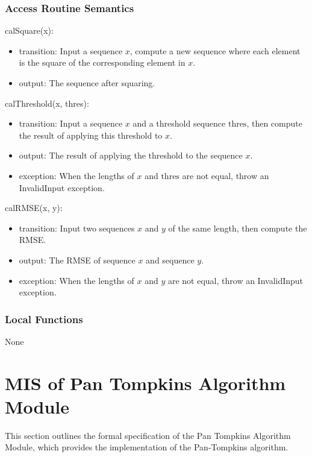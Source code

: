 \documentclass[12pt, titlepage]{article}
\begin{document}
\subsubsection{Access Routine Semantics}

\noindent calSquare(x):
\begin{itemize}
\item transition: Input a sequence $x$, compute a new sequence where each
element is the square of the corresponding element in $x$.
\item output: The sequence after squaring.
\end{itemize}

\noindent calThreshold(x, thres):
\begin{itemize}
\item transition: Input a sequence $x$ and a threshold sequence $\text{thres}$,
then compute the result of applying this threshold to $x$.
\item output: The result of applying the threshold to the sequence $x$.
\item exception: When the lengths of $x$ and $\text{thres}$ are not equal, throw
an InvalidInput exception.
\end{itemize}

\noindent calRMSE(x, y):
\begin{itemize}
\item transition: Input two sequences $x$ and $y$ of the same length, then
compute the RMSE.
\item output: The RMSE of sequence $x$ and sequence $y$.
\item exception: When the lengths of $x$ and $y$ are not equal, throw an
InvalidInput exception.
\end{itemize}

\subsubsection{Local Functions}

None

\newpage

\section{MIS of Pan Tompkins Algorithm Module} \label{MIS_Alg}

This section outlines the formal specification of the Pan Tompkins Algorithm
Module, which provides the implementation of the Pan-Tompkins algorithm.
\end{document}
